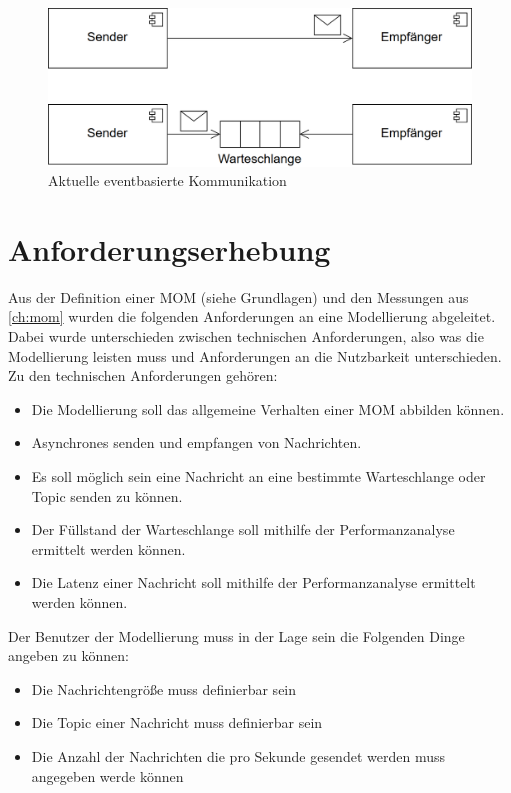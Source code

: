 \begin{figure}
\center
  \includegraphics[width=1\textwidth]{images/modelling/oldEventBased.png}
  \caption{Aktuelle eventbasierte Kommunikation}
  \label{img:oldEventBased}
\end{figure}


\section{Anforderungserhebung}
\label{sec:anforderungserhebung}
Aus der Definition einer MOM (siehe Grundlagen) und den Messungen aus \autoref{ch:mom} wurden die folgenden Anforderungen an eine Modellierung abgeleitet. Dabei wurde unterschieden zwischen technischen Anforderungen, also was die Modellierung leisten muss und Anforderungen an die Nutzbarkeit unterschieden. 
Zu den technischen Anforderungen gehören:
\begin{itemize}
    \item Die Modellierung soll das allgemeine Verhalten einer MOM abbilden können.
    \item Asynchrones senden und empfangen von Nachrichten.
    \item Es soll möglich sein eine Nachricht an eine bestimmte Warteschlange oder Topic senden zu können.
    \item Der Füllstand der Warteschlange soll mithilfe der Performanzanalyse ermittelt werden können.
    \item Die Latenz einer Nachricht soll mithilfe der Performanzanalyse ermittelt werden können.
\end{itemize}
Der Benutzer der Modellierung muss in der Lage sein die Folgenden Dinge angeben zu können:
\begin{itemize}
    \item Die Nachrichtengröße muss definierbar sein
    \item Die Topic einer Nachricht muss definierbar sein
    \item Die Anzahl der Nachrichten die pro Sekunde gesendet werden muss angegeben werde können
\end{itemize}

